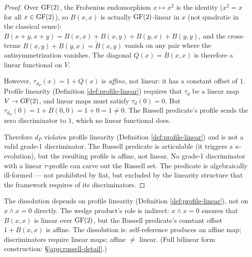 \begin{proof}
Over $\operatorname{GF}(2)$, the Frobenius endomorphism $x \mapsto x^2$
is the identity ($x^2 = x$ for all $x \in \operatorname{GF}(2)$), so
$B(x,x)$ is actually $\operatorname{GF}(2)$-linear in $x$ (not
quadratic in the classical sense): $B(x{+}y, x{+}y) =
B(x,x) + B(x,y) + B(y,x) + B(y,y)$, and the cross-terms
$B(x,y) + B(y,x) = \widetilde{B}(x,y)$ vanish on any
pair where the antisymmetrization vanishes. The diagonal
$Q(x) = B(x,x)$ is therefore a linear functional on $V$.

However, $\tau_{d_P}(x) = 1 + Q(x)$ is \emph{affine},
not linear: it has a constant offset of $1$. Profile
linearity (Definition \ref{def:profile-linear}) requires
that $\tau_d$ be a linear map $V \to \operatorname{GF}(2)$, and linear
maps must satisfy $\tau_d(0) = 0$. But
$\tau_{d_P}(0) = 1 + B(0,0) = 1 + 0 = 1 \neq 0$. The
Russell predicate's profile sends the zero discriminator
to $1$, which no linear functional does.

Therefore $d_P$ violates profile linearity (Definition \ref{def:profile-linear}) and is not a
valid grade-1 discriminator. The Russell predicate is
articulable (it triggers a $\kappa$-evolution), but the
resulting profile is affine, not linear. No grade-1
discriminator with a linear $\tau$-profile can carve out
the Russell set. The predicate is algebraically
ill-formed --- not prohibited by fiat, but excluded by the
linearity structure that the framework requires of its
discriminators.
\end{proof}

\begin{remark}
The dissolution depends on profile linearity
(Definition \ref{def:profile-linear}), not on
$x \wedge x = 0$ directly. The wedge product's role is
indirect: $x \wedge x = 0$ ensures that $B(x,x)$ is
linear over $\operatorname{GF}(2)$, but the Russell predicate's
constant offset $1 + B(x,x)$ is affine. The dissolution
is: self-reference produces an affine map; discriminators
require linear maps; affine $\neq$ linear.
(Full bilinear form construction: \S\ref{app:russell-detail}.)
\end{remark}

